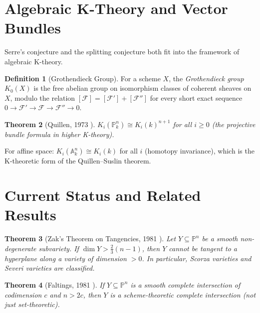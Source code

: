 \documentclass[12pt,a4paper]{amsart}
\newtheorem{theorem}{Theorem}[section]
\theoremstyle{definition}
\newtheorem{definition}[theorem]{Definition}
\theoremstyle{remark}
\newcommand{\PP}{\mathbb{P}}
\begin{document}
\section{Algebraic K-Theory and Vector Bundles}

Serre's conjecture and the splitting conjecture both fit into the framework
of algebraic K-theory.

\begin{definition}[Grothendieck Group]
For a scheme $X$, the \emph{Grothendieck group} $K_0(X)$ is the free abelian
group on isomorphism classes of coherent sheaves on $X$, modulo the relation
$[\mathcal{F}] = [\mathcal{F}'] + [\mathcal{F}'']$ for every short exact
sequence $0 \to \mathcal{F}' \to \mathcal{F} \to \mathcal{F}'' \to 0$.
\end{definition}

\begin{theorem}[Quillen, 1973 \cite{Quillen1973}]
$K_i(\PP^n_k) \cong K_i(k)^{n+1}$ for all $i \ge 0$ (the projective bundle
formula in higher K-theory).
\end{theorem}

For affine space: $K_i(\mathbb{A}^n_k) \cong K_i(k)$ for all $i$ (homotopy
invariance), which is the K-theoretic form of the Quillen--Suslin theorem.

\section{Current Status and Related Results}

\begin{theorem}[Zak's Theorem on Tangencies, 1981 \cite{Zak1993}]
Let $Y \subseteq \PP^n$ be a smooth non-degenerate subvariety.  If
$\dim Y > \frac{2}{3}(n-1)$, then $Y$ cannot be tangent to a hyperplane
along a variety of dimension $> 0$.  In particular, Scorza varieties and
Severi varieties are classified.
\end{theorem}

\begin{theorem}[Faltings, 1981 \cite{Faltings1981}]
If $Y \subseteq \PP^n$ is a smooth complete intersection of codimension $c$
and $n > 2c$, then $Y$ is a scheme-theoretic complete intersection (not just
set-theoretic).
\end{theorem}
\end{document}
